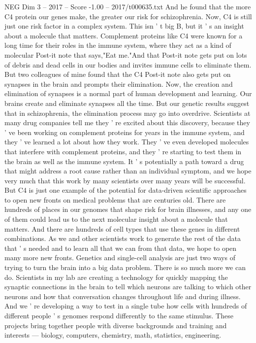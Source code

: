 \begin{textsample}{NEG Dim 3 – 2017 – Score -1.00 – 2017/t000635.txt}
And he found that the more C4 protein our genes make, the greater our risk for schizophrenia.
Now, C4 is still just one risk factor in a complex system.
This isn ' t big B, but it ' s an insight about a molecule that matters.
Complement proteins like C4 were known for a long time for their roles in the immune system, where they act as a kind of molecular Post-it note that says,"Eat me."And that Post-it note gets put on lots of debris and dead cells in our bodies and invites immune cells to eliminate them.
But two colleagues of mine found that the C4 Post-it note also gets put on synapses in the brain and prompts their elimination.
Now, the creation and elimination of synapses is a normal part of human development and learning.
Our brains create and eliminate synapses all the time.
But our genetic results suggest that in schizophrenia, the elimination process may go into overdrive.
Scientists at many drug companies tell me they ' re excited about this discovery, because they ' ve been working on complement proteins for years in the immune system, and they ' ve learned a lot about how they work.
They ' ve even developed molecules that interfere with complement proteins, and they ' re starting to test them in the brain as well as the immune system.
It ' s potentially a path toward a drug that might address a root cause rather than an individual symptom, and we hope very much that this work by many scientists over many years will be successful.
But C4 is just one example of the potential for data-driven scientific approaches to open new fronts on medical problems that are centuries old.
There are hundreds of places in our genomes that shape risk for brain illnesses, and any one of them could lead us to the next molecular insight about a molecule that matters.
And there are hundreds of cell types that use these genes in different combinations.
As we and other scientists work to generate the rest of the data that ' s needed and to learn all that we can from that data, we hope to open many more new fronts.
Genetics and single-cell analysis are just two ways of trying to turn the brain into a big data problem.
There is so much more we can do.
Scientists in my lab are creating a technology for quickly mapping the synaptic connections in the brain to tell which neurons are talking to which other neurons and how that conversation changes throughout life and during illness.
And we ' re developing a way to test in a single tube how cells with hundreds of different people ' s genomes respond differently to the same stimulus.
These projects bring together people with diverse backgrounds and training and interests — biology, computers, chemistry, math, statistics, engineering.

\end{textsample}
